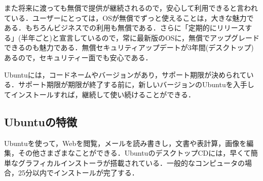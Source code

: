 また将来に渡っても無償で提供が継続されるので，安心して利用できると言われている．ユーザーにとっては，OSが無償でずっと使えることは，大きな魅力である．もちろんビジネスでの利用も無償である．さらに「定期的にリリースする」(半年ごと)と宣言しているので，常に最新版のOSに，無償でアップグレードできるのも魅力である．無償セキュリティアップデートが3年間(デスクトップ)あるので，セキュリティー面でも安心である．

Ubuntuには，コードネームやバージョンがあり，サポート期限が決められている．サポート期限が期限が終了する前に，新しいバージョンのUbuntuを入手してインストールすれば，継続して使い続けることができる\cite{ubuntu}．

\subsection{Ubuntuの特徴}

Ubuntuを使って，Webを閲覧，メールを読み書きし，文書や表計算，画像を編集，その他さまざまなことができる．UbuntuのデスクトップCDには，早くて簡単なグラフィカルインストーラが搭載されている．一般的なコンピュータの場合，25分以内でインストールが完了する．

